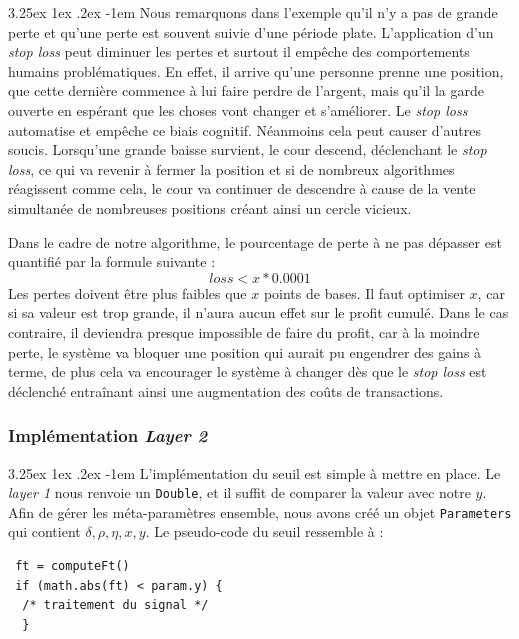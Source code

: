 \documentclass[a4paper, 11pt]{article}
\makeatletter
\renewcommand\paragraph{\@startsection{paragraph}{5}{\z@}%
  {3.25ex \@plus1ex \@minus.2ex}%
  {-1em}%
  {\normalfont\normalsize\bfseries}}
\makeatother
\begin{document}
\paragraph{}
Nous remarquons dans l'exemple qu'il n'y a pas de grande perte et qu'une perte est souvent suivie d'une période plate. L'application d'un \textit{stop loss}
peut diminuer les pertes et surtout il empêche des comportements humains problématiques. En effet, il arrive qu'une personne prenne une position, que
cette dernière commence à lui faire perdre de l'argent, mais qu'il la garde ouverte en espérant que les choses vont changer et s'améliorer. Le \textit{stop loss}
automatise et empêche ce biais cognitif. Néanmoins cela peut causer d'autres soucis. Lorsqu'une grande baisse survient, le cour descend,
déclenchant le \textit{stop loss}, ce qui va revenir à fermer la position et si de nombreux algorithmes réagissent comme cela, le cour va 
continuer de descendre à cause de la vente simultanée de nombreuses positions créant ainsi un cercle vicieux.

Dans le cadre de notre algorithme, le pourcentage de perte à ne pas dépasser est quantifié par la formule suivante :
$$loss < x * 0.0001$$
Les pertes doivent être plus faibles que $x$ points de bases. Il faut optimiser $x$, car si sa valeur est trop grande, il n'aura aucun effet sur le profit
cumulé. Dans le cas contraire, il deviendra presque impossible de faire du profit, car à la moindre perte, le système va bloquer une position qui aurait pu
engendrer des gains à terme, de plus cela va encourager le système à changer dès que le \textit{stop loss} est déclenché entraînant ainsi une augmentation des
coûts de transactions.

\subsubsection{Implémentation \textit{Layer 2}}
\paragraph{}
L'implémentation du seuil est simple à mettre en place. Le \textit{layer 1} nous renvoie un \texttt{Double}, et il suffit de comparer la valeur avec notre
$y$. Afin de gérer les méta-paramètres ensemble, nous avons créé un objet \texttt{Parameters} qui contient $\delta,\rho,\eta,x,y$. Le pseudo-code
du seuil ressemble à :

\begin{lstlisting}
 ft = computeFt()
 if (math.abs(ft) < param.y) {
  /* traitement du signal */
  }
\end{lstlisting}
\end{document}
